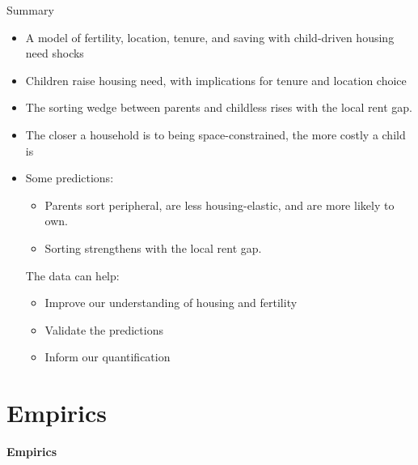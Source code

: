\documentclass[11pt,aspectratio=169]{beamer}
\begin{document}
\begin{frame}{Summary}

\small
\begin{itemize}\setlength\itemsep{0.6em}
  \item A model of fertility, location, tenure, and saving with child-driven housing need shocks
  \item Children raise housing need, with implications for tenure and location choice
  \item The sorting wedge between parents and childless rises with the local rent gap.
  \item The closer a household is to being space-constrained, the more costly a child is 
  \item Some predictions:
    \begin{itemize}\setlength\itemsep{-2pt}
      \item Parents sort peripheral, are less housing-elastic, and are more likely to own.
      \item Sorting strengthens with the local rent gap.
    \end{itemize}
The data can help:
\begin{itemize}
  \item Improve our understanding of housing and fertility
  \item Validate the predictions
  \item Inform our quantification
\end{itemize}
\end{itemize}

\end{frame}

\section{Empirics}

\begin{frame}
\centering
{\Large\textbf{Empirics}}
\end{frame}
\end{document}
